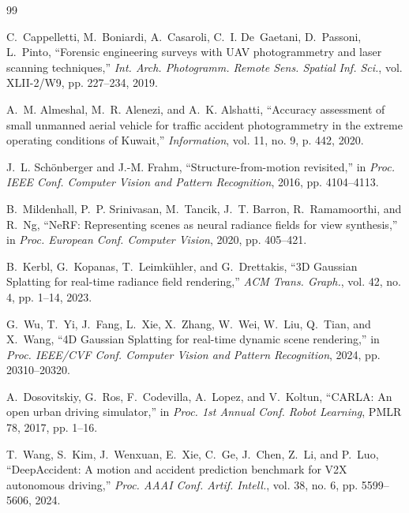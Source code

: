 \documentclass[conference]{IEEEtran}
\begin{document}
\balance

\begin{thebibliography}{99}

C.~Cappelletti, M.~Boniardi, A.~Casaroli, C.~I. De~Gaetani, D.~Passoni,
L.~Pinto, ``Forensic engineering surveys with UAV photogrammetry and laser
scanning techniques,'' \emph{Int. Arch. Photogramm. Remote Sens. Spatial Inf.
Sci.}, vol. XLII-2/W9, pp. 227--234, 2019.

A.~M. Almeshal, M.~R. Alenezi, and A.~K. Alshatti, ``Accuracy assessment of
small unmanned aerial vehicle for traffic accident photogrammetry in the
extreme operating conditions of Kuwait,'' \emph{Information}, vol. 11, no. 9,
p. 442, 2020.

J.~L. Sch\"{o}nberger and J.-M. Frahm, ``Structure-from-motion revisited,'' in
\emph{Proc. IEEE Conf. Computer Vision and Pattern Recognition}, 2016,
pp. 4104--4113.

B.~Mildenhall, P.~P. Srinivasan, M.~Tancik, J.~T. Barron, R.~Ramamoorthi, and
R.~Ng, ``NeRF: Representing scenes as neural radiance fields for view
synthesis,'' in \emph{Proc. European Conf. Computer Vision}, 2020,
pp. 405--421.

B.~Kerbl, G.~Kopanas, T.~Leimk\"{u}hler, and G.~Drettakis, ``3D Gaussian
Splatting for real-time radiance field rendering,'' \emph{ACM Trans. Graph.},
vol. 42, no. 4, pp. 1--14, 2023.

G.~Wu, T.~Yi, J.~Fang, L.~Xie, X.~Zhang, W.~Wei, W.~Liu, Q.~Tian, and X.~Wang,
``4D Gaussian Splatting for real-time dynamic scene rendering,'' in
\emph{Proc. IEEE/CVF Conf. Computer Vision and Pattern Recognition}, 2024,
pp. 20310--20320.

A.~Dosovitskiy, G.~Ros, F.~Codevilla, A.~Lopez, and V.~Koltun, ``CARLA: An
open urban driving simulator,'' in \emph{Proc. 1st Annual Conf. Robot
Learning}, PMLR 78, 2017, pp. 1--16.

T.~Wang, S.~Kim, J.~Wenxuan, E.~Xie, C.~Ge, J.~Chen, Z.~Li, and P.~Luo,
``DeepAccident: A motion and accident prediction benchmark for V2X autonomous
driving,'' \emph{Proc. AAAI Conf. Artif. Intell.}, vol. 38, no. 6,
pp. 5599--5606, 2024.

\end{thebibliography}
\end{document}
